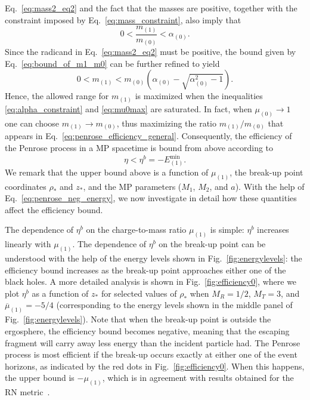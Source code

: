Eq.~\eqref{eq:mass2_eq2} and the fact that the masses are positive, together with the constraint imposed by Eq.~\eqref{eq:mass_constraint}, also imply that
\begin{equation}\label{eq:bound_of_m1_m0}
  0 < \frac{m_{(1)}}{m_{(0)}} < \alpha_{(0)} .
\end{equation}
Since the radicand in Eq.~\eqref{eq:mass2_eq2} must be positive, the bound given by Eq.~\eqref{eq:bound_of_m1_m0} can be further refined to yield
\begin{equation} \label{eq:m1_max}
  0 < m_{(1)} < m_{(0)} \left( \alpha_{(0)} - \sqrt{\alpha_{(0)}^2 - 1} \right).
\end{equation}
Hence, the allowed range for $m_{(1)}$ is maximized when the inequalities \eqref{eq:alpha_constraint} and \eqref{eq:mu0max} are saturated. In fact, when $\mu_{(0)} \rightarrow 1$ one can choose $m_{(1)}\rightarrow m_{(0)}$, thus maximizing the ratio $m_{(1)}/m_{(0)}$ that appears in Eq.~\eqref{eq:penrose_efficiency_general}. Consequently, the efficiency of the Penrose process in a MP spacetime is bound from above according to
\begin{equation} \label{eq:eta_max_theory}
  \eta < \eta ^{b}  = -E_{(1)}^{\mathrm {min}}.
\end{equation}
%
We remark that the upper bound above is a function of $\mu_{(1)}$, the break-up point coordinates $\rho_*$ and $z_*$, and the MP parameters ($M_1$, $M_2$, and $a$). With the help of Eq.~\eqref{eq:penrose_neg_energy}, we now investigate in detail how these quantities affect the efficiency bound.

The dependence of $\eta^{b}$ on the charge-to-mass ratio $\mu_{(1)}$ is simple: $\eta^{b}$ increases linearly with $\mu_{(1)}$. The dependence of $\eta^{b}$ on the break-up point can be understood with the help of the energy levels shown in Fig.~\ref{fig:energylevels}: the efficiency bound increases as the break-up point approaches either one of the black holes. A more detailed analysis is shown in Fig.~\ref{fig:efficiency0}, where we plot $\eta^{b}$ as a function of $z_*$ for selected values of $\rho_*$ when $M_R=1/2$, $M_T=3$, and $\overline \mu_{(1)} = -5/4$ (corresponding to the energy levels shown in the middle panel of Fig.~\ref{fig:energylevels}). Note that when the break-up point is outside the ergosphere, the efficiency bound becomes negative, meaning that the escaping fragment will carry away less energy than the incident particle had. The Penrose process is most efficient if the break-up occurs exactly at either one of the event horizons, as indicated by the red dots in Fig.~\ref{fig:efficiency0}. When this happens, the upper bound is $-\mu_{(1)}$, which is in agreement with results obtained for the RN metric~\cite{bhat1985energetics,parthasarathy1986high}.

